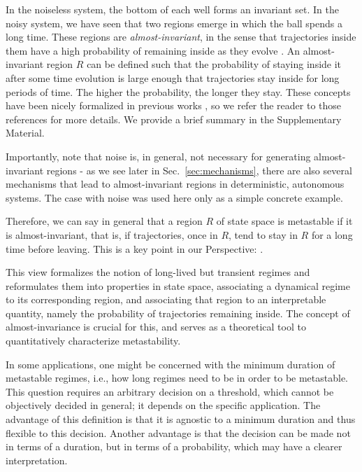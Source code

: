 In the noiseless system, the bottom of each well forms an invariant set. In the noisy system, we have seen that two regions emerge in which the ball spends a long time. These regions are \textit{almost-invariant}, in the sense that trajectories inside them have a high probability of remaining inside as they evolve \cite{froyland2005statistically, dellnitz2003congestion}. An almost-invariant region $R$ can be defined such that the probability of staying inside it after some time evolution is large enough that trajectories stay inside for long periods of time. The higher the probability, the longer they stay.  These concepts have been nicely formalized in previous works \cite{froyland2005statistically, dellnitz2003congestion}, so we refer the reader to those references for more details. We provide a brief summary in the Supplementary Material.

Importantly, note that noise is, in general, not necessary for generating almost-invariant regions - as we see later in Sec.~\ref{sec:mechanisms}, there are also several mechanisms that lead to almost-invariant regions in deterministic, autonomous systems. The case with noise was used here only as a simple concrete example.

Therefore, we can say in general that a region $R$ of state space is metastable if it is almost-invariant, that is, if trajectories, once in $R$, tend to stay in $R$ for a long time before leaving. This is a key point in our Perspective: .  

This view formalizes the notion of long-lived but transient regimes and reformulates them into properties in state space, associating a dynamical regime to its corresponding region, and associating that region to an interpretable quantity, namely the probability of trajectories remaining inside. The concept of almost-invariance is crucial for this, and serves as a theoretical tool to quantitatively characterize metastability.

In some applications, one might be concerned with the minimum duration of metastable regimes, i.e., how long regimes need to be in order to be metastable. This question requires an arbitrary decision on a threshold, which cannot be objectively decided in general; it depends on the specific application. The advantage of this definition is that it is agnostic to a minimum duration and thus flexible to this decision. Another advantage is that the decision can be made not in terms of a duration, but in terms of a probability, which may have a clearer interpretation. 

